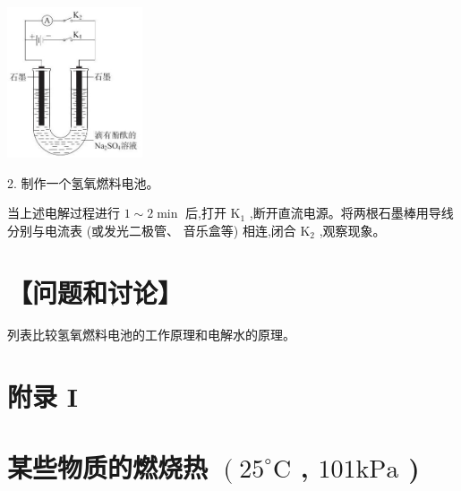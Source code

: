 \documentclass[10pt]{article}
\begin{document}
\begin{center}
\includegraphics[max width=0.3\textwidth]{images/0190da9d-8bfd-732f-bc2c-0b21d0f13b91_128_261174.jpg}
\end{center}

2. 制作一个氢氧燃料电池。

当上述电解过程进行 \(1 \sim 2\min\) 后,打开 \({\mathrm{K}}_{1}\) ,断开直流电源。将两根石墨棒用导线分别与电流表 (或发光二极管、 音乐盒等) 相连,闭合 \({\mathrm{K}}_{2}\) ,观察现象。

\section*{【问题和讨论】}

列表比较氢氧燃料电池的工作原理和电解水的原理。

\section*{附录 I}

\section*{某些物质的燃烧热 \(\left( {{25}^{ \circ }\mathrm{C}}\right.\) , \({101}\mathrm{{kPa}}\) )}
\end{document}
